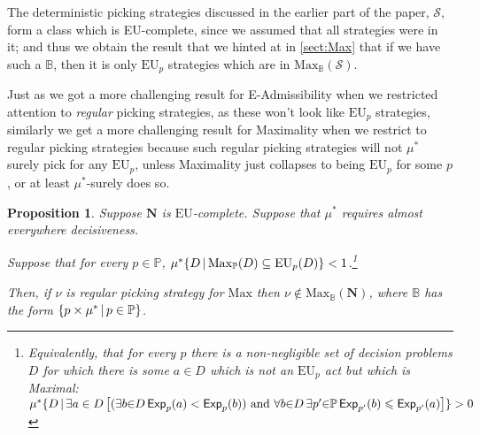 \documentclass[a4paper]{article}
\newtheorem{proposition}[theorem]{Proposition}
\newcommand\N{\mathbf{N}}
\renewcommand\S{\mathcal{S}}
\newcommand\s{\mathsf{s}}
\renewcommand\P{\mathbb{P}} %
\newcommand\Exp{\mathsf{Exp}}
\newcommand\EU{\mathrm{EU}}
\newcommand\U{\mathfrak{U}} %
\newcommand\Maximality{\mathrm{Max}}
\newcommand{\IB}{\mathbb{B}}
\newcommand{\IP}{\P}
\newcommand{\todoinfo}[2][]{\todo[backgroundcolor=orange!80,bordercolor=black,linecolor=gray!80, #1,inline,caption={}]{#2}}
\renewcommand{\color}[1]{}
\newcommand\SetDelimiter[1][]{
	\nonscript\,#1\vert \allowbreak \nonscript\,\mathopen{}}
\providecommand\given{\SetDelimiter}
\renewcommand{\leq}{\leqslant}
\newenvironment{CCM rewritten}
{\begingroup\color{blue}} %
{\endgroup}              %
\begin{document}

The deterministic picking strategies discussed in the earlier part of the paper, $\S$, form a class which is EU-complete, since we assumed that all strategies were in it; and thus we obtain the result that we hinted at in \cref{sect:Max} that if we have such a $\IB$, then it is only $\EU_p$ strategies which are in $\Maximality_\IB(\S)$.



{\color{violet}Just as we got a more challenging result for E-Admissibility when we restricted attention to \emph{regular} picking strategies, as these won't look like $\EU_p$ strategies, similarly we get a more challenging result for Maximality when we restrict to regular picking strategies because such regular picking strategies will not $\mu^*$ surely pick for any $\EU_p$, unless Maximality just collapses to being $\EU_p$ for some $p$, or at least $\mu^*$-surely does so.}

\begin{proposition}\label{thm:max-nu-reg-nec}
	Suppose $\N$ is $\EU$-complete.  
	Suppose that $\mu^*$ requires almost everywhere decisiveness.

	Suppose that for every $p\in\IP$, $\mu^*\{D\given \Maximality_\IP(D)\subseteq\EU_p(D)\}< 1$.\footnote{Equivalently, that for every $p$ there is a non-negligible set of decision problems $D$ for which there is some $a\in D$ which is not an $\EU_p$ act but which is Maximal: $\mu^*\{D\given \exists a\in D\left[(\exists b{\in} D \, \Exp_{p}(a)<\Exp_{p}(b))\text{ and }\forall b{\in} D\, \exists p'{\in}\IP \,\Exp_{p'}(b)\leq \Exp_{p'}(a)\right]\}>0$}
	
	Then, if $\nu$ is regular picking strategy for $\Maximality$ then $\nu\notin \Maximality_\IB(\N)$, where 	$\IB$ has the form $\{p\times \mu^*\given p\in \IP\}$. 
\end{proposition}
\end{document}

